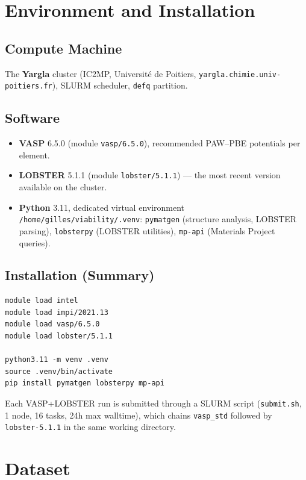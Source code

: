 \documentclass[11pt,a4paper]{article}
\begin{document}
\section{Environment and Installation}

\subsection{Compute Machine}

The \textbf{Yargla} cluster (IC2MP, Université de Poitiers,
\texttt{yargla.chimie.univ-poitiers.fr}), SLURM scheduler, \texttt{defq}
partition.

\subsection{Software}

\begin{itemize}
  \item \textbf{VASP} 6.5.0 (module \texttt{vasp/6.5.0}), recommended
    PAW--PBE potentials per element.
  \item \textbf{LOBSTER} 5.1.1 (module \texttt{lobster/5.1.1}) --- the most
    recent version available on the cluster.
  \item \textbf{Python} 3.11, dedicated virtual environment
    \texttt{/home/gilles/viability/.venv}:
    \texttt{pymatgen} (structure analysis, LOBSTER parsing),
    \texttt{lobsterpy} (LOBSTER utilities),
    \texttt{mp-api} (Materials Project queries).
\end{itemize}

\subsection{Installation (Summary)}

\begin{lstlisting}
module load intel
module load impi/2021.13
module load vasp/6.5.0
module load lobster/5.1.1

python3.11 -m venv .venv
source .venv/bin/activate
pip install pymatgen lobsterpy mp-api
\end{lstlisting}

Each VASP+LOBSTER run is submitted through a SLURM script
(\texttt{submit.sh}, 1 node, 16 tasks, 24h max walltime), which chains
\texttt{vasp\_std} followed by \texttt{lobster-5.1.1} in the same working
directory.

\section{Dataset}
\end{document}
